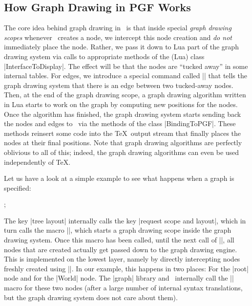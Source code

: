 \subsection{How Graph Drawing in PGF Works}

The core idea behind graph drawing in \pgfname\ is that inside special
\emph{graph drawing scopes} whenever \pgfname\ creates a node, we
intercept this node creation and \emph{do not} immediately place the 
node. Rather, we pass it down to Lua part of the graph drawing system
via calls to appropriate methods of the (Lua) class
|InterfaceToDisplay|. The effect will be that the nodes are ``tucked
away'' in some internal tables. For edges, we introduce a 
special command called |\pgfgdedge| that tells the graph drawing
system that there is an edge between two tucked-away nodes. Then,
at the end of the graph drawing scope, a graph drawing algorithm
written in Lua starts to work on the graph by computing new positions
for the nodes. Once the algorithm has finished, the graph drawing
system starts sending back the nodes and edges to \pgfname\ via the
methods of the class |BindingToPGF|. These methods reinsert some code
into the \TeX\ output stream that finally places the nodes at 
their final positions. Note that graph drawing algorithms are
perfectly oblivious to all of this; indeed, the graph drawing
algorithms can even be used independently of \TeX.

Let us have a look at a simple example to see what happens when a
graph is specified:

\begin{codeexample}[]
  ;
\end{codeexample}

The key |tree layout| internally calls the key |request scope and layout|,
which in turn calls the macro |\pgfgdbeginscope|, which starts a graph
drawing scope inside the graph drawing system. Once this macro has been 
called, until the next call of |\pgfgdendscope|, all nodes that are
created actually get passed down to the graph drawing engine. This is
implemented on the lowest layer, namely by directly intercepting
nodes freshly created using |\pgfnode|. In our example, this happens
in two places: For the |root| node and for the |World| node. The
|graph| library and \tikzname\ internally call the |\pgfnode| macro
for these two nodes (after a large number of internal syntax
translations, but the graph drawing system does not care about them). 

